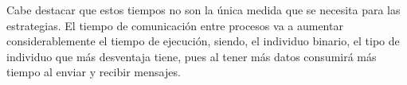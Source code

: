 		
		
		
		
		Cabe destacar que estos tiempos no son la única medida que se necesita para las estrategias. El tiempo de comunicación entre procesos va a aumentar considerablemente el tiempo de ejecución, siendo, el individuo binario, el tipo de individuo que más desventaja tiene, pues al tener más datos consumirá más tiempo al enviar y recibir mensajes.
		




